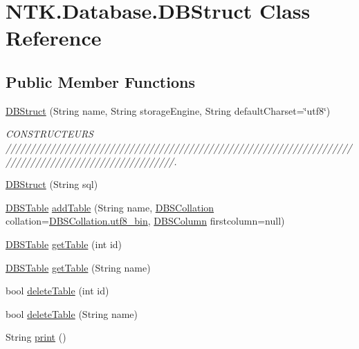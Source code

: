 \hypertarget{class_n_t_k_1_1_database_1_1_d_b_struct}{}\section{N\+T\+K.\+Database.\+D\+B\+Struct Class Reference}
\label{class_n_t_k_1_1_database_1_1_d_b_struct}
\subsection*{Public Member Functions}
\begin{DoxyCompactItemize}
\item 
\mbox{\hyperlink{class_n_t_k_1_1_database_1_1_d_b_struct_a4407e47c99c373a0aa24d8c1a75a96e5}{D\+B\+Struct}} (String name, String storage\+Engine, String default\+Charset=\char`\"{}utf8\char`\"{})
\begin{DoxyCompactList}\small\item\em C\+O\+N\+S\+T\+R\+U\+C\+T\+E\+U\+RS ////////////////////////////////////////////////////////////////////////////////////////////////////////. \end{DoxyCompactList}\item 
\mbox{\hyperlink{class_n_t_k_1_1_database_1_1_d_b_struct_a6d75a7e254b6a4ca1cd4bab20ef69061}{D\+B\+Struct}} (String sql)
\item 
\mbox{\hyperlink{class_n_t_k_1_1_database_1_1_d_b_s_table}{D\+B\+S\+Table}} \mbox{\hyperlink{class_n_t_k_1_1_database_1_1_d_b_struct_a4f3ed4839ae46e280b37086a9e4d1a77}{add\+Table}} (String name, \mbox{\hyperlink{namespace_n_t_k_1_1_database_aa31c221c4926a0f02117557ca9883c03}{D\+B\+S\+Collation}} collation=\mbox{\hyperlink{namespace_n_t_k_1_1_database_aa31c221c4926a0f02117557ca9883c03a4fad0ebc37542e51064c07c063f2abc2}{D\+B\+S\+Collation.\+utf8\+\_\+bin}}, \mbox{\hyperlink{class_n_t_k_1_1_database_1_1_d_b_s_column}{D\+B\+S\+Column}} firstcolumn=null)
\item 
\mbox{\hyperlink{class_n_t_k_1_1_database_1_1_d_b_s_table}{D\+B\+S\+Table}} \mbox{\hyperlink{class_n_t_k_1_1_database_1_1_d_b_struct_a682f9e3a52a28461d2949f4395e06eae}{get\+Table}} (int id)
\item 
\mbox{\hyperlink{class_n_t_k_1_1_database_1_1_d_b_s_table}{D\+B\+S\+Table}} \mbox{\hyperlink{class_n_t_k_1_1_database_1_1_d_b_struct_ae2b27af45753c3c042a7b35b821c348c}{get\+Table}} (String name)
\item 
bool \mbox{\hyperlink{class_n_t_k_1_1_database_1_1_d_b_struct_a4be59f659fb4ff1f3562df7111f3a20c}{delete\+Table}} (int id)
\item 
bool \mbox{\hyperlink{class_n_t_k_1_1_database_1_1_d_b_struct_a4c7c7f42dca52171dfcbda4f135bc0c9}{delete\+Table}} (String name)
\item 
String \mbox{\hyperlink{class_n_t_k_1_1_database_1_1_d_b_struct_a1ec23692e19fbf99ca5dfa4316b2edde}{print}} ()
\end{DoxyCompactItemize}
